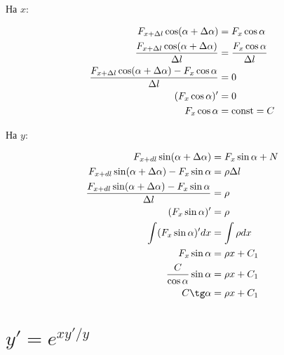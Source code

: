 На $x$:

\begin{align*}
    F_{x+\Delta l} \cos(\alpha + \Delta\alpha)                                    & = F_x \cos \alpha                  \\
    \frac{F_{x+\Delta l} \cos(\alpha + \Delta\alpha)}{\Delta l}                   & = \frac{F_x \cos \alpha}{\Delta l} \\
    \frac{F_{x+\Delta l} \cos(\alpha + \Delta\alpha) - F_x \cos \alpha}{\Delta l} & = 0                                \\
    (F_{x}\cos\alpha)'                                                            & = 0                                \\
    F_{x}\cos\alpha                                                               & = \text{const} = C                       \\
\end{align*}

На $y$:

\begin{align*}
    F_{x+dl} \sin(\alpha + \Delta\alpha)                                    & = F_x \sin \alpha + N \\
    F_{x+dl} \sin(\alpha + \Delta\alpha) - F_x \sin \alpha                  & = \rho \Delta l       \\
    \frac{F_{x+dl} \sin(\alpha + \Delta\alpha) - F_x \sin \alpha}{\Delta l} & = \rho                \\
    (F_x \sin \alpha)'                                                      & = \rho                \\
    \int (F_x \sin \alpha)' dx                                              & = \int \rho dx        \\
    F_x \sin \alpha                                                         & = \rho x + C_1        \\
    \frac{C}{\cos \alpha} \sin \alpha                                       & = \rho x + C_1        \\
    C \tg \alpha                                                            & = \rho x + C_1        \\
\end{align*}


\section{$y'=e^{xy'/y}$}

